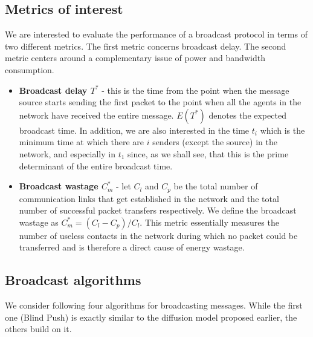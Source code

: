 \subsection{Metrics of interest}
We are interested to evaluate the performance of a broadcast protocol in terms of two different metrics. The first metric concerns broadcast delay. 
The second metric centers around a complementary issue of power and bandwidth consumption.
\begin{itemize}
 \item \textbf{Broadcast delay $T^*$} - this is the time from the point when the message source starts sending the first packet to the point when all the agents in the network have received the entire message. 
 $E(T^*)$ denotes the expected broadcast time. 
 In addition, we are also interested in the time $t_i$ which is the minimum time at which there are $i$ senders (except the source) in the network, and especially in $t_1$ since, as we shall see, that this is the prime determinant of the entire broadcast time. 
 \item \textbf{Broadcast wastage $C_m^*$} - let $C_l$ and $C_p$ be the total number of communication links that get established in the network and the total number of successful packet transfers respectively. We define the broadcast wastage as $C_m^* = (C_l - C_p)/C_l$. This metric essentially measures the number of useless contacts in the network during which no packet could be transferred and is therefore a direct cause of energy wastage.
\end{itemize}

\subsection{Broadcast algorithms}
We consider following four algorithms for broadcasting messages. While the first one (Blind Push) is exactly similar to the diffusion model proposed earlier, the others 
build on it.
